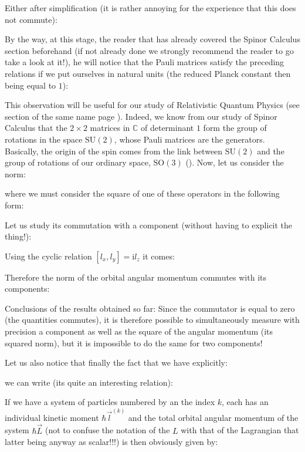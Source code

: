 	Either after simplification (it is rather annoying for the experience that this does not commute):
	
	By the way, at this stage, the reader that has already covered the Spinor Calculus section beforehand (if not already done we strongly recommend the reader to go take a look at it!), he will notice that the Pauli matrices satisfy the preceding relations if we put ourselves in natural units (the reduced Planck constant then being equal to $1$):
	
	This observation will be useful for our study of Relativistic Quantum Physics (see section of the same name page \pageref{relativistic quantum physics}). Indeed, we know from our study of Spinor Calculus that the $2\times 2$ matrices in $\mathbb{C}$ of determinant $1$ form the group of rotations in the space $\text{SU}(2)$, whose Pauli matrices are the generators. Basically, the origin of the spin comes from the link between $\text{SU}(2)$ and the group of rotations of our ordinary space, $\text{SO}(3)$ ().
	Now, let us consider the norm:
	
	where we must consider the square of one of these operators in the following form:
	
	Let us study its commutation with a component (without having to explicit the thing!):
	
	Using the cyclic relation $[l_x,l_y]=\mathrm{i}l_z$ it comes:
	
	Therefore the norm of the orbital angular momentum commutes with its components:
	
	Conclusions of the results obtained so far: Since the commutator is equal to zero (the quantities commutes), it is therefore possible to simultaneously measure with precision a component as well as the square of the angular momentum (its squared norm), but it is impossible to do the same for two components!
	
	Let us also notice that finally the fact that we have explicitly:
	
	we can write (its quite an interesting relation):
	
	If we have a system of particles numbered by an the index $k$, each has an individual kinetic moment $\hbar\vec{l}^{(k)}$ and the total orbital angular momentum of the system $\hbar\vec{L}$ (not to confuse the notation of the $L$ with that of the Lagrangian that latter being anyway as scalar!!!) is then obviously given by:
	
